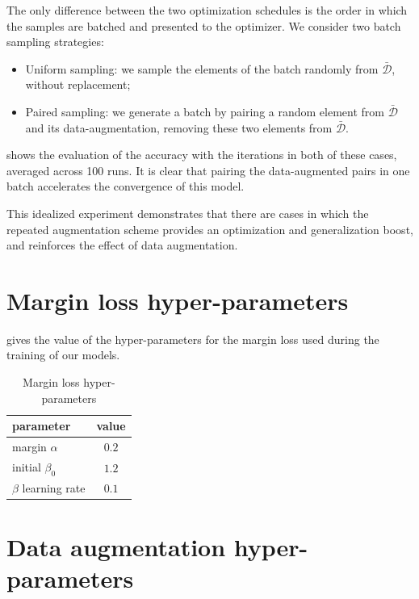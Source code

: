 The only difference between the two optimization schedules is the order in which the samples are batched and presented to the optimizer. 
We consider two batch sampling strategies:
\begin{itemize}
    \item Uniform sampling: we sample the elements of the batch randomly from  $\bar{\mathcal{D}}$, without replacement;
    \item Paired sampling: we generate a batch by pairing a random element from $\bar{\mathcal{D}}$ and its data-augmentation, removing these two elements from $\bar{\mathcal{D}}$.
\end{itemize}
 shows the evaluation of the accuracy with the iterations in both of these cases, averaged across 100 runs. 
It is clear that pairing the data-augmented pairs in one batch accelerates the convergence of this model. 

This idealized experiment demonstrates that there are cases in which the repeated augmentation scheme provides an optimization and generalization boost, and reinforces the effect of data augmentation.

\section{Margin loss hyper-parameters}

%

%
\label{sec:training-hyperparam}

%
gives the value of the hyper-parameters for the margin loss used during the training of our models.


\begin{table}
\centering
\caption{\label{tab:training-hyperparam}
	Margin loss hyper-parameters
}
%
\begin{tabular}{@{}lc@{}}
\toprule
parameter             & value \\ \midrule
margin $\alpha$       & $0.2$ \\
initial $\beta_0$     & $1.2$ \\
$\beta$ learning rate & $0.1$ \\
\bottomrule
\end{tabular}
%
\end{table}

%
%


\section{Data augmentation hyper-parameters}

